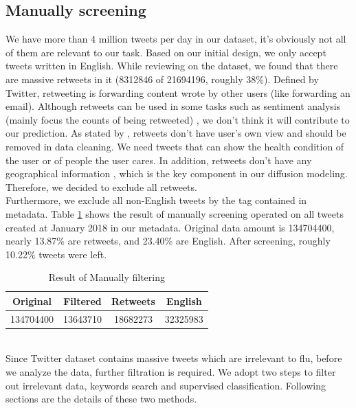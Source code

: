 \subsection{Manually screening}
\label{sec:Manually screening}
We have more than 4 million tweets per day in our dataset, it's obviously not all of them are relevant to our task. Based on our initial design, we only accept tweets written in English. While reviewing on the dataset, we found that there are massive retweets in it (8312846 of 21694196, roughly 38\%). Defined by Twitter\cite{twitter_dev}, retweeting is forwarding content wrote by other users (like forwarding an email). Although retweets can be used in some tasks such as sentiment analysis (mainly focus the counts of being retweeted) \cite{perdana2018combining}, we don't think it will contribute to our prediction. As stated by \cite{kim2016competitive}, retweets don't have user's own view and should be removed in data cleaning. We need tweets that can show the health condition of the user or of people the user cares. In addition, retweets don't have any geographical information \cite{twitter_dev}, which is the key component in our diffusion modeling. Therefore, we decided to exclude all retweets.\\ Furthermore, we exclude all non-English tweets by the tag contained in metadata. Table \ref{tab:manual} shows the result of manually screening operated on all tweets created at January 2018 in our metadata. Original data amount is 134704400, nearly 13.87\% are retweets, and 23.40\% are English. After screening, roughly 10.22\% tweets were left.
\begin{table}[!htbp]
    \centering
    \hspace{0.5cm}
    \begin{tabular}{cccc}
        Original & Filtered & Retweets & English\\ \hline
        134704400 & 13643710 & 18682273 & 32325983
    \end{tabular}
    \caption{Result of Manually filtering}
    \label{tab:manual}
\end{table}
\\
Since Twitter dataset contains massive tweets which are irrelevant to flu, before we analyze the data, further filtration is required. We adopt two steps to filter out irrelevant data, keywords search and supervised classification. Following sections are the details of these two methods.

